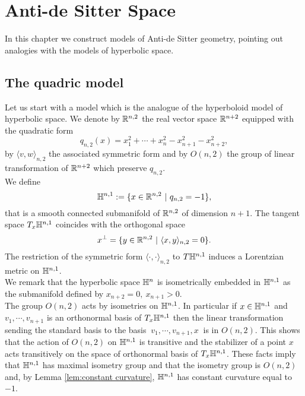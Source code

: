 \chapter{Anti-de Sitter Space} \label{chapter:2}

In this chapter we construct models of Anti-de Sitter geometry, pointing out analogies with the models of hyperbolic space.

\section{The quadric model}
Let us start with a model which is the analogue of the hyperboloid model of hyperbolic space. We denote by $\mathbb{R} ^{n,2}$ the real vector space $\mathbb{R} ^{n+2}$ equipped with the quadratic form
\[
q_{n,2}(x) = x_1^2 + \cdots + x_n^2 - x_{n+1}^2 - x_{n+2}^2,
\]
by $\langle v,w \rangle_{n,2}$ the associated symmetric form and by $O(n,2)$ the group of linear transformation of $\mathbb{R}^{n+2}$ which preserve $q_{n,2}$.\\
We define
\[
\mathbb{H}^{n,1} := \{ x\in \mathbb{R}^{n,2} \ | \ q_{n,2} = -1 \},
\]
that is a smooth connected submanifold of $\mathbb{R}^{n,2}$ of dimension $n+1$. The tangent space $T_x \mathbb{H}^{n,1}$ coincides with the orthogonal space
\[
x^\perp = \{ y\in\mathbb{R}^{n,2} \ | \ \langle x,y \rangle_{n,2}=0 \}.
\]
The restriction of the symmetric form $\langle \cdot , \cdot \rangle_{n,2}$ to $T\mathbb{H}^{n,1}$ induces a Lorentzian metric on $\mathbb{H}^{n,1}$.\\
We remark that the hyperbolic space $\mathbb{H}^n$ is isometrically embedded in $\mathbb{H}^{n,1}$ as the submanifold defined by $x_{n+2}=0,\ x_{n+1}>0$.\\
The group $O(n,2)$ acts by isometries on $\mathbb{H}^{n,1}$. In particular if $x\in \mathbb{H}^{n,1}$ and $v_1, \cdots , v_{n+1}$ is an orthonormal basis of $T_x \mathbb{H}^{n,1}$ then the linear transformation sending the standard basis to the basis $\ v_1,\cdots,v_{n+1},x \ $ is in $O(n,2)$. This shows that the action of $O(n,2)$ on $\mathbb{H}^{n,1}$ is transitive and the stabilizer of a point $x$ acts transitively on the space of orthonormal basis of $T_x\mathbb{H}^{n,1}$. 
These facts imply that $\mathbb{H}^{n,1}$ has maximal isometry group and that the isometry group is $O(n,2)$ and, by Lemma \ref{lem:constant curvature}, $\mathbb{H}^{n,1}$ has constant curvature equal to $-1$.\\

